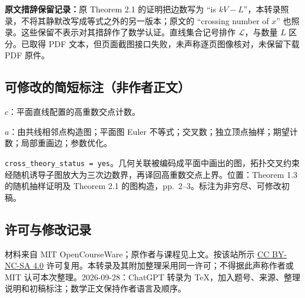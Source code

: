 \documentclass[UTF8,11pt]{ctexart}
\begin{document}
\textbf{原文措辞保留记录：}原 Theorem 2.1 的证明把边数写为 ``is $kV-L$''，本转录照录，不将其静默改写成等式之外的另一版本；原文的 ``crossing number of $x$'' 也照录。这些保留不表示对其措辞作了数学认证。直线集合记号排作 $\mathcal L$，与数量 $L$ 区分。已取得 PDF 文本，但页面截图接口失败，未声称逐页图像核对，未保留下载 PDF 原件。

\subsection*{可修改的简短标注（非作者正文）}
$c$：平面直线配置的高重数交点计数。

$a$：由共线相邻点构造图；平面图 Euler 不等式；交叉数；独立顶点抽样；期望计数；局部重画边；参数优化。

\texttt{cross\_theory\_status = yes}。几何关联被编码成平面中画出的图，拓扑交叉约束经随机诱导子图放大为三次边数界，再译回高重数交点上界。位置：Theorem 1.3 的随机抽样证明及 Theorem 2.1 的图构造，pp.~2--3。标注为非穷尽、可修改初稿。
\subsection*{许可与修改记录}
材料来自 MIT OpenCourseWare；原作者与课程见上文。按该站所示 \href{https://creativecommons.org/licenses/by-nc-sa/4.0/}{CC BY-NC-SA 4.0} 许可复用。本转录及其附加整理采用同一许可；不得据此声称作者或 MIT 认可本次整理。2026-09-28：ChatGPT 转录为 TeX，加入题号、来源、整理说明和初稿标注；数学正文保持作者语言及顺序。
\end{document}

